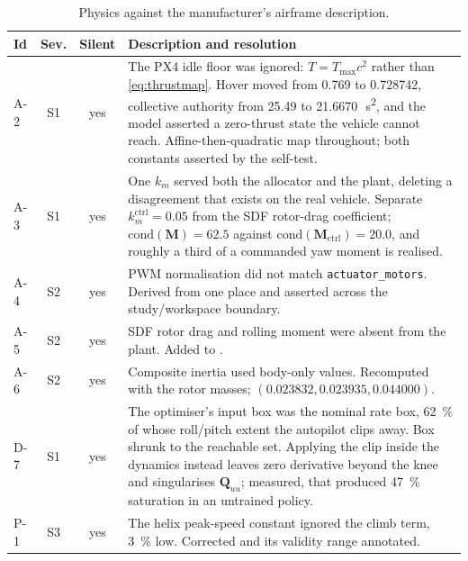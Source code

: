 \documentclass[11pt,a4paper,twoside,openright]{report}
\newcommand{\vUhover}{0.728742}          %
\newcommand{\vDadc}{21.6670}             %
\newcommand{\vCondPlant}{62.5}           %
\newcommand{\vCondCtrl}{20.0}            %
\newcommand{\vKmCtrl}{0.05}              %
\newcommand{\vJxx}{0.023832}
\newcommand{\vJyy}{0.023935}
\newcommand{\vJzz}{0.044000}
\newcommand{\mat}[1]{\bm{#1}}
\theoremstyle{plain}
\theoremstyle{definition}
\theoremstyle{remark}
\begin{document}
	\begin{table}[htbp]
		\centering
		\caption{Physics against the manufacturer's airframe description.}
		\label{tab:audit-physics}
		\scriptsize
		\begin{tabularx}{\linewidth}{@{}l c c X@{}}
			\toprule
			\textbf{Id} & \textbf{Sev.} & \textbf{Silent} & \textbf{Description and resolution} \\
			\midrule
			A-2 & S1 & yes & The PX4 idle floor was ignored: $T=T_{\max}c^2$ rather than \cref{eq:thrustmap}. Hover moved from \num{0.769} to \vUhover, collective authority from \SI{25.49}{} to \vDadc\,\si{\per\square\second}, and the model asserted a zero-thrust state the vehicle cannot reach. Affine-then-quadratic map throughout; both constants asserted by the self-test. \\
			A-3 & S1 & yes & One $k_m$ served both the allocator and the plant, deleting a disagreement that exists on the real vehicle. Separate $k_m^\mathrm{ctrl}=\vKmCtrl$ from the SDF rotor-drag coefficient; $\mathrm{cond}(\mat M)=\vCondPlant$ against $\mathrm{cond}(\mat M_\mathrm{ctrl})=\vCondCtrl$, and roughly a third of a commanded yaw moment is realised. \\
			A-4 & S2 & yes & PWM normalisation did not match \texttt{actuator\_motors}. Derived from one place and asserted across the study/workspace boundary. \\
			A-5 & S2 & yes & SDF rotor drag and rolling moment were absent from the plant. Added to \crefrange{eq:fp-trans}{eq:fp-rot}. \\
			A-6 & S2 & yes & Composite inertia used body-only values. Recomputed with the rotor masses; $(\vJxx,\vJyy,\vJzz)$. \\
			D-7 & S1 & yes & The optimiser's input box was the nominal rate box, \SI{62}{\percent} of whose roll/pitch extent the autopilot clips away. Box shrunk to the reachable set. Applying the clip inside the dynamics instead leaves zero derivative beyond the knee and singularises $\mat Q_{uu}$; measured, that produced \SI{47}{\percent} saturation in an untrained policy. \\
			P-1 & S3 & yes & The helix peak-speed constant ignored the climb term, \SI{3}{\percent} low. Corrected and its validity range annotated. \\
			\bottomrule
		\end{tabularx}
	\end{table}
\end{document}
